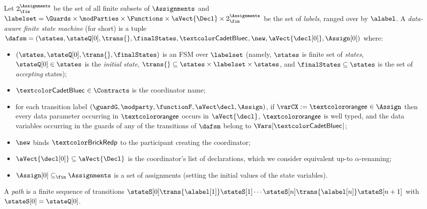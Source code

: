 \begin{definition}\label{def:dafsm}
  Let $2^{\Assignments}_{\fin}$ be the set of all finite subsets of
  $\Assignments$ and
  $\labelset = \Guards \times \modParties \times \Functions \times
  \aVect{\Decl} \times 2^{\Assignments}_{\fin}$ be the set of
  \emph{labels}, ranged over by $\alabel$.
  A \emph{data-aware finite state machine} (\modelname for short) is a
  tuple
  $\dafsm = (\states,\stateQ[0],\trans{},\finalStates,
  \contractC,\new,\aVect{\decl[0]},\Assign[0])$ where:
\begin{itemize}
\item $(\states, \stateQ[0], \trans{}, \finalStates)$ is an FSM over
  $\labelset$ (namely, $\states$ is finite set of \emph{states},
  $\stateQ[0] \in \states$ is the \emph{initial state},
  $\trans{} \subseteq \states \times \labelset \times \states$, and
  $\finalStates \subseteq \states$ is the set of \emph{accepting}
  states);
\item $\contractC \in \Contracts$ is the coordinator name;
\item for each transition label
  $(\guardG, \modparty, \functionF, \aVect\decl, \Assign)$, if
  $\varCX := \exprE \in \Assign$ then every data parameter occurring in $\exprE$ occurs in
  $\aVect{\decl}$, $\exprE$ is well typed, and the data
  variables occurring in the guards of any of the transitions of
  $\dafsm$ belong to $\Vars[\contractC]$;
\item $\new$ binds $\partyP$ to the participant creating the
  coordinator;
\item $\aVect{\decl[0]} \subseteq \aVect{\Decl}$ is the coordinator's list
  of declarations, which we consider equivalent up-to
  $\alpha$-renaming;
\item $\Assign[0] \subseteq_{\fin} \Assignments$ is a set of
  assignments (setting the initial values of the state variables).
\end{itemize}
%
A \emph{path} is a finite sequence of transitions
$\stateS[0] \trans{\alabel[1]} \stateS[1] \cdots \stateS[n]
\trans{\alabel[n]} \stateS[n+1]$ with $\stateS[0] = \stateQ[0]$.
\end{definition}

